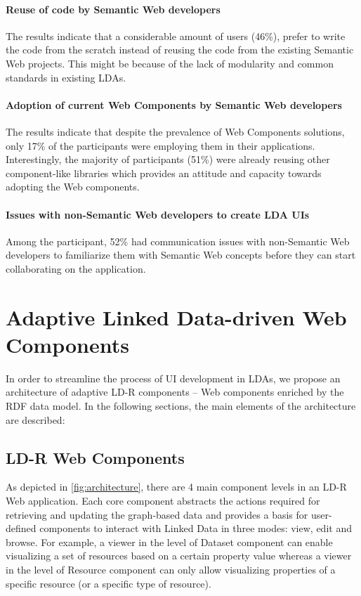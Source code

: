\documentclass{acm_proc_article-sp}
\begin{document}
 
\paragraph{Reuse of code by Semantic Web developers}
The results indicate that a considerable amount of users (46\%), prefer to write the code from the scratch instead of reusing the code from the existing Semantic Web projects.
This might be because of the lack of modularity and common standards in existing LDAs.

\paragraph{Adoption of current Web Components by Semantic Web developers}
The results indicate that despite the prevalence of Web Components solutions, only 17\% of the participants were employing them in their applications.
Interestingly, the majority of participants (51\%) were already reusing other component-like libraries which provides an attitude and capacity towards adopting the Web components.

\paragraph{Issues with non-Semantic Web developers to create LDA UIs}
Among the participant, 52\% had communication issues with non-Semantic Web developers to familiarize them with Semantic Web concepts before they can start collaborating on the application.

\section{Adaptive Linked Data-driven Web Components}
In order to streamline the process of UI development in LDAs, we propose an architecture of adaptive LD-R components -- Web components enriched by the RDF data model.
In the following sections, the main elements of the architecture are described:

\subsection{LD-R Web Components}
As depicted in \autoref{fig:architecture}, there are 4 main component levels in an LD-R Web application.
Each core component abstracts the actions required for retrieving and updating the graph-based data and provides a basis for user-defined components to interact with Linked Data in three modes: view, edit and browse.
For example, a viewer in the level of Dataset component can enable visualizing a set of resources based on a certain property value whereas a viewer in the level of Resource component can only allow visualizing properties of a specific resource (or a specific type of resource).
\end{document}
